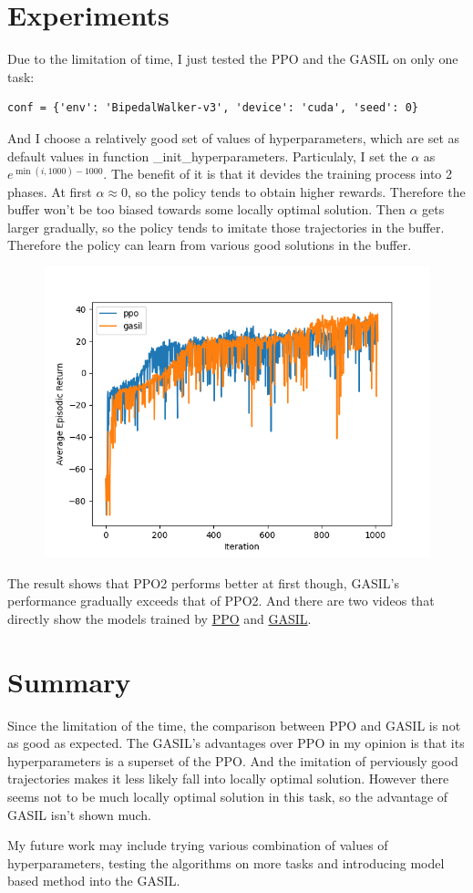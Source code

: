 \documentclass[UTF8, a4paper, 11pt]{article}
\begin{document}
\section{Experiments}
Due to the limitation of time, I just tested the PPO and the GASIL on only one task:
\begin{lstlisting}
conf = {'env': 'BipedalWalker-v3', 'device': 'cuda', 'seed': 0}
\end{lstlisting}
And I choose a relatively good set of values of hyperparameters, which are set as default values in function \_init\_hyperparameters. Particulaly, I set the $\alpha$
as $e^{\min(i,1000)-1000}$. The benefit of it is that it devides the training process into 2 phases. At first $\alpha\approx0$, so the policy tends to obtain higher
rewards. Therefore the buffer won't be too biased towards some locally optimal solution. Then $\alpha$ gets larger gradually, so the policy tends to imitate those
trajectories in the buffer. Therefore the policy can learn from various good solutions in the buffer.
\begin{figure}[H]
    \centering
    \includegraphics[width = \textwidth]{Figure_1.png}
\end{figure}
The result shows that PPO2 performs better at first though, GASIL's performance gradually exceeds that of PPO2. And there are two videos that directly show the models
trained by \href{run:./Vid/ppo.mp4}{PPO} and \href{run:./Vid/gasil.mp4}{GASIL}.
\section{Summary}
Since the limitation of the time, the comparison between PPO and GASIL is not as good as expected. The GASIL's advantages over PPO in my opinion is that its
hyperparameters is a superset of the PPO. And the imitation of perviously good trajectories makes it less likely fall into locally optimal solution. However there
seems not to be much locally optimal solution in this task, so the advantage of GASIL isn't shown much.

My future work may include trying various combination of values of hyperparameters, testing the algorithms on more tasks and introducing model based method into the
GASIL.
%
%
\end{document}
